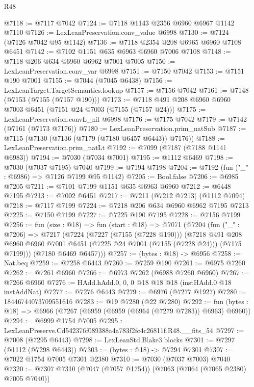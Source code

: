 \begin{lexlean}{R48}
\begin{coremodule}
@7118 := @7117 @7042
@7124 := @7118 @1143 @2356 @6960 @6967 @1142 @7110
@7126 := LexLeanPreservation.conv_value @6998
@7130 := @7124 (@7126 @7042 @95 @1142)
@7136 := @7118 @2354 @208 @6965 @6960 @7108 @6451
@7142 := @7102 @1151 @635 @6963 @6960 @7006 @7108
@7148 := @7118 @206 @634 @6960 @6962 @7001 @7005
@7150 := LexLeanPreservation.conv_var @6998
@7151 := @7150 @7042
@7153 := @7151 @190 @7001
@7155 := @7044 (@7045 @6438)
@7156 := LexLeanTarget.TargetSemantics.lookup
@7157 := @7156 @7042
@7161 := @7148 (@7153 (@7155 (@7157 @190)))
@7173 := @7118 @491 @208 @6960 @6960 @7003 @6451 (@7151 @24 @7003 (@7155 (@7157 @24)))
@7175 := LexLeanPreservation.convL_nil @6998
@7176 := @7175 @7042
@7179 := @7142 (@7161 (@7173 @7176))
@7180 := LexLeanPreservation.prim_natSub
@7187 := @7115 (@7130 (@7136 (@7179 (@7180 @6457 @6443)) @7176))
@7188 := LexLeanPreservation.prim_natLt
@7192 := @7099 (@7187 (@7188 @1141 @6983))
@7194 := @7030 (@7034 @7001)
@7195 := @1112 @6469
@7198 := @7030 (@7037 @7195) @7040
@7199 := @7194 @7198
@7204 := @7192 (fun ("_" : @6986) => @7126 @7199 @95 @1142)
@7205 := Bool.false
@7206 := @6985 @7205
@7211 := @7101 @7199 @1151 @635 @6963 @6960
@7212 := @6448 @7195
@7213 := @7002 @6451
@7217 := @7211 (@7212 @7213) (@1112 @7094)
@7218 := @7117 @7199
@7224 := @7218 @206 @634 @6960 @6962 @7195 @7213
@7225 := @7150 @7199
@7227 := @7225 @190 @7195
@7228 := @7156 @7199
@7256 := fun (size : @18) =>
  fun (start : @18) =>
  @7071
    (@7204
      (fun ("_" : @7206) =>
      @7217
        (@7224
          (@7227 (@7155 (@7228 @190)))
          (@7218
            @491
            @208
            @6960
            @6960
            @7001
            @6451
            (@7225 @24 @7001 (@7155 (@7228 @24)))
            (@7175 @7199)))
        (@7180 @6469 @6457)))
@7257 := (bytes : @18) -> @6956
@7258 := Nat.beq
@7259 := @7258 @6443
@7260 := @7259 @190
@7261 := @6975 @7260
@7262 := @7261 @6960
@7266 := @6973 @7262 (@6988 @7260 @6960)
@7267 := @7266 @6960
@7276 := HAdd.hAdd.{0, 0, 0} @18 @18 @18 (instHAdd.{0} @18 instAddNat)
@7277 := @7276 @6443
@7279 := @6976 (@7277 @1927)
@7280 := 18446744073709551616
@7283 := @19 @7280 (@22 @7280)
@7292 := fun (bytes : @18) => @6966 (@7267 (@6959 (@6959 (@6964 (@7279 @7283)) @6963) @6960))
@7294 := @6999 @1754 @7005
@7295 := LexLeanPreserve.Cd542376f089388a4a783f2fc4c26811f.R48.__fits_54
@7297 := @7008 (@7295 @6443)
@7298 := LexLeanStd.Blake3.blocks
@7301 := @7297 (@1112 (@7298 @6443))
@7303 := (bytes : @18) -> @7294 @7301
@7307 := @7022 @1754 @7005 @7301 @2380
@7310 := @7030 (@7037 @7003) @7040
@7320 := @7307 @7310 (@7047 (@7057 @1754)) (@7063 (@7064 (@7065 @2380) @7005 @7040))

\end{coremodule}
\end{lexlean}
